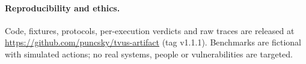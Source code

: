\documentclass[letterpaper]{article} %
\begin{document}
\paragraph{Reproducibility and ethics.}
Code, fixtures, protocols, per-execution verdicts and raw traces are released at \url{https://github.com/puncsky/tvus-artifact} (tag v1.1.1). Benchmarks are fictional with simulated actions; no real systems, people or vulnerabilities are targeted.


\end{document}
